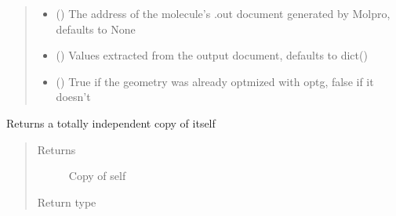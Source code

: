 \documentclass[letterpaper,10pt,english]{sphinxmanual}
\begin{document}
\begin{fulllineitems}
\begin{quote}
\begin{description}
\begin{itemize}
\item {} 
\sphinxAtStartPar
{} (\sphinxstyleliteralemphasis{\sphinxupquote{, }}) \textendash{} The address of the molecule’s .out document generated by Molpro, defaults to None

\item {} 
\sphinxAtStartPar
{} (\sphinxstyleliteralemphasis{\sphinxupquote{{[}}}\sphinxstyleliteralemphasis{\sphinxupquote{, }}\sphinxstyleliteralemphasis{\sphinxupquote{{]}}}\sphinxstyleliteralemphasis{\sphinxupquote{, }}) \textendash{} Values extracted from the output document, defaults to dict()

\item {} 
\sphinxAtStartPar
{} (\sphinxstyleliteralemphasis{\sphinxupquote{, }}) \textendash{} True if the geometry was already optmized with optg, false if it doesn’t

\end{itemize}

\end{description}\end{quote}

\begin{fulllineitems}
\label{\detokenize{molecular:molecular.Molecule.copy}}
\sphinxAtStartPar
Returns a totally independent copy of itself
\begin{quote}\begin{description}
\item[{Returns}] \leavevmode
\sphinxAtStartPar
Copy of self

\item[{Return type}] \leavevmode
\sphinxAtStartPar
{\hyperref[\detokenize{molecular:molecular.Molecule}]{}}


\end{description}
\end{quote}
\end{fulllineitems}
\end{fulllineitems}
\end{document}
